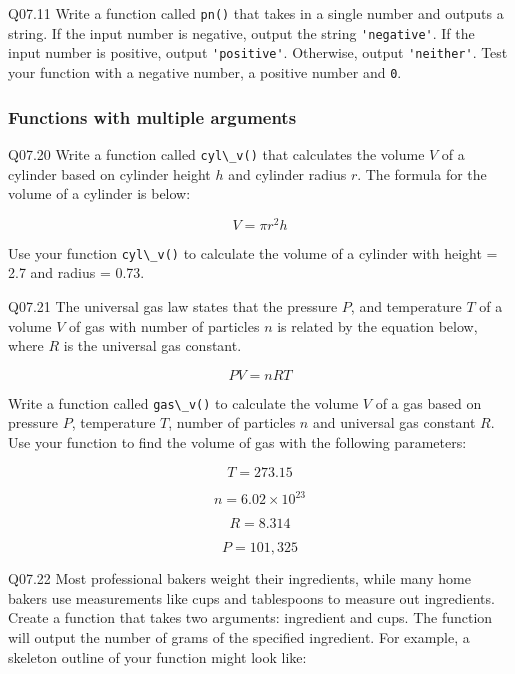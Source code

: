 \documentclass{book}
\newenvironment{problems}{}{}  %
\newcommand{\passthrough}[1]{#1}
\begin{document}
\begin{problems}
Q07.11 Write a function called \passthrough{\lstinline!pn()!} that takes
in a single number and outputs a string. If the input number is
negative, output the string \passthrough{\lstinline!'negative'!}. If the
input number is positive, output \passthrough{\lstinline!'positive'!}.
Otherwise, output \passthrough{\lstinline!'neither'!}. Test your
function with a negative number, a positive number and
\passthrough{\lstinline!0!}.
        \end{problems}

    




    
        \hypertarget{functions-with-multiple-arguments}{%
\subsubsection{Functions with multiple
arguments}\label{functions-with-multiple-arguments}}

Q07.20 Write a function called \passthrough{\lstinline!cyl\_v()!} that
calculates the volume \(V\) of a cylinder based on cylinder height \(h\)
and cylinder radius \(r\). The formula for the volume of a cylinder is
below:

\[ V = \pi r^2 h \]

Use your function \passthrough{\lstinline!cyl\_v()!} to calculate the
volume of a cylinder with height = 2.7 and radius = 0.73.

Q07.21 The universal gas law states that the pressure \(P\), and
temperature \(T\) of a volume \(V\) of gas with number of particles
\(n\) is related by the equation below, where \(R\) is the universal gas
constant.

\[ PV = nRT \]

Write a function called \passthrough{\lstinline!gas\_v()!} to calculate
the volume \(V\) of a gas based on pressure \(P\), temperature \(T\),
number of particles \(n\) and universal gas constant \(R\). Use your
function to find the volume of gas with the following parameters:

\[ T = 273.15\]

\[ n = 6.02 \times 10^{23} \]

\[ R = 8.314 \]

\[ P = 101,325 \]

Q07.22 Most professional bakers weight their ingredients, while many
home bakers use measurements like cups and tablespoons to measure out
ingredients. Create a function that takes two arguments: ingredient and
cups. The function will output the number of grams of the specified
ingredient. For example, a skeleton outline of your function might look
like:
\end{document}
